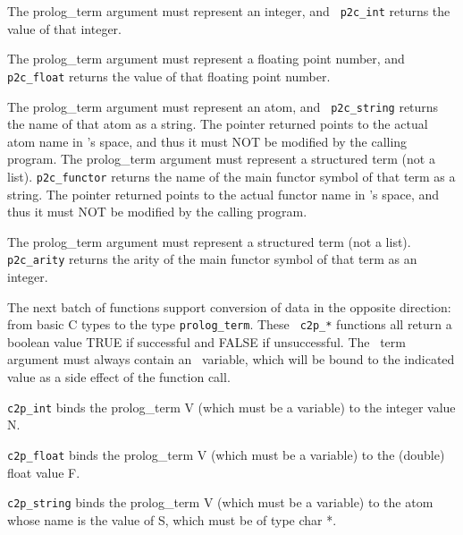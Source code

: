 \begin{description}
 
    The prolog\_term argument must represent an integer, and {\tt
    p2c\_int} returns the value of that integer.

 
    The prolog\_term argument must represent a floating point number,
    and {\tt p2c\_float} returns the value of that floating point
    number.

 
    The prolog\_term argument must represent an atom, and {\tt
    p2c\_string} returns the name of that atom as a string. The
    pointer returned points to the actual atom name in \ourprolog 's
    space, and thus it must NOT be modified by the calling program.
 
    The prolog\_term argument must represent a structured term (not a
    list).  {\tt p2c\_functor} returns the name of the main functor
    symbol of that term as a string. The pointer returned points to
    the actual functor name in \ourprolog 's space, and thus it must
    NOT be modified by the calling program.

 
    The prolog\_term argument must represent a structured term (not a
    list).  {\tt p2c\_arity} returns the arity of the main functor
    symbol of that term as an integer.
\end{description}

The next batch of functions support conversion of data in the opposite
direction: from basic C types to the type {\tt prolog\_term}.  These {\tt
  c2p\_*} functions all return a boolean value TRUE if successful and FALSE
if unsuccessful.  The \ourprolog\ term argument must always contain an
\ourprolog\ variable, which will be bound to the indicated value as a side
effect of the function call.

\begin{description}
 
    {\tt c2p\_int} binds the prolog\_term V (which must be a variable)
    to the integer value N.

 
    {\tt c2p\_float} binds the prolog\_term V (which must be a variable)
    to the (double) float value F.

 
    {\tt c2p\_string} binds the prolog\_term V (which must be a
    variable) to the atom whose name is the value of S, which must be
    of type char *.
\end{description}

